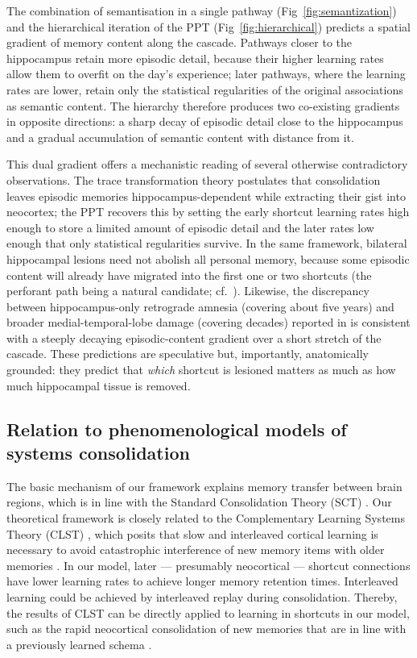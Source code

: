 The combination of semantisation in a single pathway (Fig~\ref{fig:semantization}) and the hierarchical iteration of the PPT (Fig~\ref{fig:hierarchical}) predicts a spatial gradient of memory content along the cascade. Pathways closer to the hippocampus retain more episodic detail, because their higher learning rates allow them to overfit on the day's experience; later pathways, where the learning rates are lower, retain only the statistical regularities of the original associations as semantic content. The hierarchy therefore produces two co-existing gradients in opposite directions: a sharp decay of episodic detail close to the hippocampus and a gradual accumulation of semantic content with distance from it.

This dual gradient offers a mechanistic reading of several otherwise contradictory observations. The trace transformation theory \cite{Winocur2010, Winocur2011} postulates that consolidation leaves episodic memories hippocampus-dependent while extracting their gist into neocortex; the PPT recovers this by setting the early shortcut learning rates high enough to store a limited amount of episodic detail and the later rates low enough that only statistical regularities survive. In the same framework, bilateral hippocampal lesions need not abolish all personal memory, because some episodic content will already have migrated into the first one or two shortcuts (the perforant path being a natural candidate; cf.~\cite{Lux2016}). Likewise, the discrepancy between hippocampus-only retrograde amnesia (covering about five years) and broader medial-temporal-lobe damage (covering decades) reported in \cite{Bayley2006} is consistent with a steeply decaying episodic-content gradient over a short stretch of the cascade. These predictions are speculative but, importantly, anatomically grounded: they predict that \emph{which} shortcut is lesioned matters as much as how much hippocampal tissue is removed.

\subsection{Relation to phenomenological models of systems consolidation}

The basic mechanism of our framework explains memory transfer between brain regions, which is in line with the Standard Consolidation Theory (SCT) \cite{Squire1995, McClelland1995}. Our theoretical framework is closely related to the Complementary Learning Systems Theory (CLST) \cite{McClelland1995, McClelland2013}, which posits that slow and interleaved cortical learning is necessary to avoid catastrophic interference of new memory items with older memories \cite{McCloskey1989}.
In our model, later --- presumably neocortical --- shortcut connections have lower learning rates to achieve longer memory retention times. Interleaved learning could be achieved by interleaved replay \cite{Foster2017, Schuck2019, Liu2019} during consolidation.
Thereby, the results of CLST can be directly applied to learning in shortcuts in our model, such as the rapid neocortical consolidation of new memories that are in line with a previously learned schema \cite{Tse2007, Tse2011, McClelland2013}.

